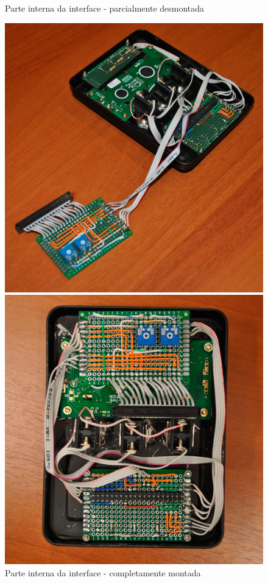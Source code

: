 \begin{figure}[htb]
	\centering
 	\begin{minipage}{0.45\textwidth}
		\centering
		\caption{\label{fig:interface-traz1}Parte interna da interface - parcialmente desmontada}
		\includegraphics[width=1\textwidth]{img/interface-traz1.jpg}
	\end{minipage}
	\hfill
	\begin{minipage}{0.45\textwidth}
		\centering
		\caption{\label{fig:interface-traz2}Parte interna da interface - completamente montada}
		\includegraphics[width=1\textwidth]{img/interface-traz2.jpg}
	\end{minipage}
\end{figure}

